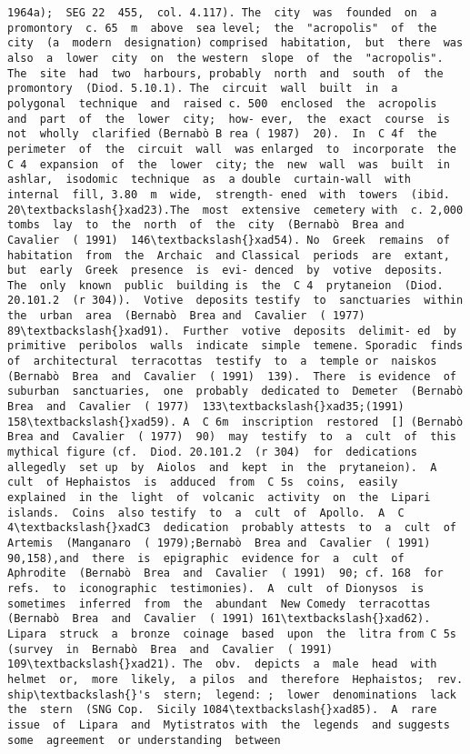 \documentclass[11pt]{article}
\begin{document}
\begin{Verbatim}[commandchars=\\\{\}]
1964a);  SEG 22  455,  col. 4.117). The  city  was  founded  on  a  promontory  c. 65  m  above  sea level;  the  "acropolis"  of  the  city  (a  modern  designation) comprised  habitation,  but  there  was  also  a  lower  city  on  the western  slope  of  the  "acropolis".  The  site  had  two  harbours, probably  north  and  south  of  the  promontory  (Diod. 5.10.1). The  circuit  wall  built  in  a  polygonal  technique  and  raised c. 500  enclosed  the  acropolis  and  part  of  the  lower  city;  how- ever,  the  exact  course  is  not  wholly  clarified (Bernabò B rea ( 1987)  20).  In  C 4f  the  perimeter  of  the  circuit  wall  was enlarged  to  incorporate  the  C 4  expansion  of  the  lower  city; the  new  wall  was  built  in  ashlar,  isodomic  technique  as  a double  curtain-wall  with  internal  fill, 3.80  m  wide,  strength- ened  with  towers  (ibid. 20\textbackslash{}xad23).The  most  extensive  cemetery with  c. 2,000  tombs  lay  to  the  north  of  the  city  (Bernabò  Brea and  Cavalier  ( 1991)  146\textbackslash{}xad54). No  Greek  remains  of  habitation  from  the  Archaic  and Classical  periods  are  extant,  but  early  Greek  presence  is  evi- denced  by  votive  deposits.  The  only  known  public  building is  the  C 4  prytaneion  (Diod. 20.101.2  (r 304)).  Votive  deposits testify  to  sanctuaries  within  the  urban  area  (Bernabò  Brea and  Cavalier  ( 1977)  89\textbackslash{}xad91).  Further  votive  deposits  delimit- ed  by  primitive  peribolos  walls  indicate  simple  temene. Sporadic  finds of  architectural  terracottas  testify  to  a  temple or  naiskos  (Bernabò  Brea  and  Cavalier  ( 1991)  139).  There  is evidence  of  suburban  sanctuaries,  one  probably  dedicated to  Demeter  (Bernabò  Brea  and  Cavalier  ( 1977)  133\textbackslash{}xad35;(1991) 158\textbackslash{}xad59). A  C 6m  inscription  restored  [] (Bernabò Brea and  Cavalier  ( 1977)  90)  may  testify  to  a  cult  of  this  mythical figure (cf.  Diod. 20.101.2  (r 304)  for  dedications  allegedly  set up  by  Aiolos  and  kept  in  the  prytaneion).  A  cult  of Hephaistos  is  adduced  from  C 5s  coins,  easily  explained  in the  light  of  volcanic  activity  on  the  Lipari  islands.  Coins  also testify  to  a  cult  of  Apollo.  A  C 4\textbackslash{}xadC3  dedication  probably attests  to  a  cult  of  Artemis  (Manganaro  ( 1979);Bernabò  Brea and  Cavalier  ( 1991)  90,158),and  there  is  epigraphic  evidence for  a  cult  of  Aphrodite  (Bernabò  Brea  and  Cavalier  ( 1991)  90; cf. 168  for  refs.  to  iconographic  testimonies).  A  cult  of Dionysos  is  sometimes  inferred  from  the  abundant  New Comedy  terracottas  (Bernabò  Brea  and  Cavalier  ( 1991) 161\textbackslash{}xad62). Lipara  struck  a  bronze  coinage  based  upon  the  litra from C 5s  (survey  in  Bernabò  Brea  and  Cavalier  ( 1991)  109\textbackslash{}xad21). The  obv.  depicts  a  male  head  with  helmet  or,  more  likely,  a pilos  and  therefore  Hephaistos;  rev.  ship\textbackslash{}'s  stern;  legend: ;  lower  denominations  lack  the  stern  (SNG Cop.  Sicily 1084\textbackslash{}xad85).  A  rare  issue  of  Lipara  and  Mytistratos with  the  legends  and suggests  some  agreement  or understanding  between  
\end{Verbatim}
\end{document}
